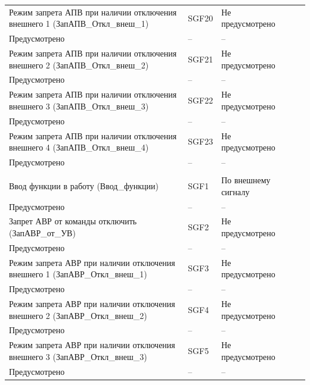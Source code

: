\begin{longtable}{|>{\centering\arraybackslash}m{5.3cm}|>{\centering\arraybackslash}m{3.3cm}|>{\centering\arraybackslash}m{4.2cm}|>{\centering\arraybackslash}m{1.8cm}|>{\centering\arraybackslash}m{1cm}|}
\hline
\centering Режим запрета АПВ при наличии отключения внешнего 1 (ЗапАПВ\_Откл\_внеш\_1)  & \centering SGF20 & \centering Не предусмотрено \\ Предусмотрено & \centering -- & \centering \arraybackslash -- \\
\hline
\centering Режим запрета АПВ при наличии отключения внешнего 2 (ЗапАПВ\_Откл\_внеш\_2)  & \centering SGF21 & \centering Не предусмотрено \\ Предусмотрено & \centering -- & \centering \arraybackslash -- \\
\hline
\centering Режим запрета АПВ при наличии отключения внешнего 3 (ЗапАПВ\_Откл\_внеш\_3)  & \centering SGF22 & \centering Не предусмотрено \\ Предусмотрено & \centering -- & \centering \arraybackslash -- \\
\hline
\centering Режим запрета АПВ при наличии отключения внешнего 4 (ЗапАПВ\_Откл\_внеш\_4)  & \centering SGF23 & \centering Не предусмотрено \\ Предусмотрено & \centering -- & \centering \arraybackslash -- \\
\hline
\multicolumn{5}{|c|}{ ЗАВР } \\ \hline 
\centering Ввод функции в работу (Ввод\_функции)  & \centering SGF1 & \centering По внешнему сигналу \\ Предусмотрено & \centering -- & \centering \arraybackslash -- \\
\hline
\centering Запрет АВР от команды отключить (ЗапАВР\_от\_УВ)  & \centering SGF2 & \centering Не предусмотрено \\ Предусмотрено & \centering -- & \centering \arraybackslash -- \\
\hline
\centering Режим запрета АВР при наличии отключения внешнего 1 (ЗапАВР\_Откл\_внеш\_1)  & \centering SGF3 & \centering Не предусмотрено \\ Предусмотрено & \centering -- & \centering \arraybackslash -- \\
\hline
\centering Режим запрета АВР при наличии отключения внешнего 2 (ЗапАВР\_Откл\_внеш\_2)  & \centering SGF4 & \centering Не предусмотрено \\ Предусмотрено & \centering -- & \centering \arraybackslash -- \\
\hline
\centering Режим запрета АВР при наличии отключения внешнего 3 (ЗапАВР\_Откл\_внеш\_3)  & \centering SGF5 & \centering Не предусмотрено \\ Предусмотрено & \centering -- & \centering \arraybackslash -- \\

\end{longtable}
